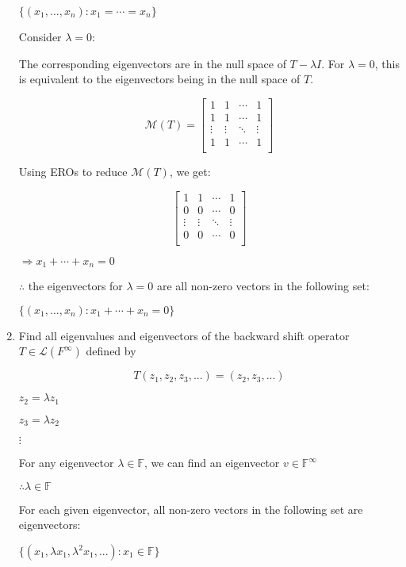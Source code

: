\documentclass[fleqn]{article}
\makeatletter
\newenvironment{equationCenter}{\@fleqnfalse\begin{equation*}}{\end{equation*}}
\makeatother
\begin{document}
\begin{enumerate}[nolistsep]
			$\{(x_1,...,x_n) : x_1 = \cdots = x_n\}$ 
			
			\pagebreak
			Consider $\lambda = 0$:
			
			The corresponding eigenvectors are in the null space of $T - {\lambda}I$. For $\lambda = 0$, this is equivalent to the eigenvectors being in the null space of $T$.
			
			\begin{equation*}
				\mathcal{M}(T) = \begin{bmatrix}
					1 & 1 & \cdots & 1\\
					1 & 1 & \cdots & 1\\
					\vdots & \vdots & \ddots & \vdots\\
					1 & 1 & \cdots & 1\\    
				\end{bmatrix}
			\end{equation*}
			
			Using EROs to reduce $\mathcal{M}(T)$, we get:
			
			\begin{equation*}
				\begin{bmatrix}
					1 & 1 & \cdots & 1\\
					0 & 0 & \cdots & 0\\
					\vdots & \vdots & \ddots & \vdots\\
					0 & 0 & \cdots & 0\\    
				\end{bmatrix}
			\end{equation*}
			
			$\Rightarrow x_1 + \cdots + x_n = 0$
			
			$\therefore$ the eigenvectors for $\lambda = 0$ are all non-zero vectors in the following set:
		
		$\{(x_1, ..., x_n) : x_1 + \cdots + x_n = 0\}$
			
			\item Find all eigenvalues and eigenvectors of the backward shift operator \newline $T \in \mathcal{L}(F^{\infty})$ defined by
			
				\begin{equationCenter}
					T(z_1, z_2, z_3,...) = (z_2, z_3,...)
				\end{equationCenter}
				
				$z_2 = {\lambda}z_1$
				
				$z_3 = {\lambda}z_2$
				
				$\vdots$
				
				For any eigenvector $\lambda \in \mathbb{F}$, we can find an eigenvector $v \in \mathbb{F}^\infty$
				 
				 $\therefore \lambda \in \mathbb{F}$
				 
				 For each given eigenvector, all non-zero vectors in the following set are eigenvectors:
				 
				 $\{(x_1,{\lambda}x_1,{\lambda}^2x_1, ...) : x_1 \in \mathbb{F}\}$
	\end{enumerate}
\end{document}
